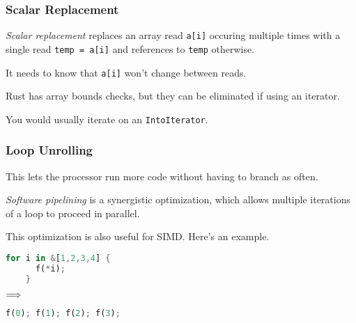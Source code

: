 \begin{frame}
\frametitle{Scalar Replacement}

\emph{Scalar replacement} replaces an array read {\tt a[i]}
occuring multiple times with a single read {\tt temp = a[i]} and references
to {\tt temp} otherwise. 

It needs to know that {\tt a[i]} won't change
between reads.

Rust has array bounds checks, but they can be eliminated if using an iterator.

You would usually iterate on an \texttt{IntoIterator}.


\end{frame}

\begin{frame}[fragile]
\frametitle{Loop Unrolling}

This
lets the processor run more code without having to branch
as often. 

\emph{Software pipelining} is a synergistic optimization,
which allows multiple iterations of a loop to proceed in parallel.


This optimization is also useful for SIMD. Here's an example.
\begin{center}
\vspace*{-1em}
\begin{minipage}{.3\textwidth}
  \begin{lstlisting}[language=Rust]
    for i in &[1,2,3,4] {
      f(*i);
    }
  \end{lstlisting}
  \end{minipage} $\Longrightarrow \hspace*{2em}$ \begin{minipage}{.4\textwidth}
  \begin{lstlisting}[language=Rust]
f(0); f(1); f(2); f(3);
  \end{lstlisting}
  \end{minipage}
  \end{center}

\end{frame}

